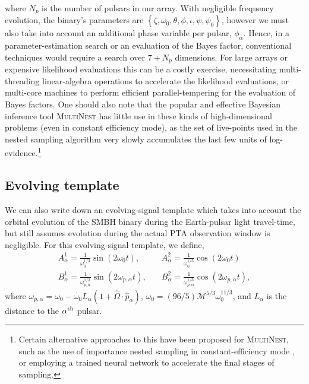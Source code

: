 \documentclass[twocolappendix,tighten]{emulateapj}
\begin{document}
where $N_p$ is the number of pulsars in our array. With negligible frequency evolution, the binary's parameters are $\left\{\zeta,\omega_0,\theta,\phi,\iota,\psi,\psi_0\right\}$, however we must also take into account an additional phase variable per pulsar, $\phi_{\alpha}$. Hence, in a parameter-estimation search or an evaluation of the Bayes factor, conventional techniques would require a search over $7+N_{p}$ dimensions. For large arrays or expensive likelihood evaluations this can be a costly exercise, necessitating multi-threading linear-algebra operations to accelerate the likelihood evaluations, or multi-core machines to perform efficient parallel-tempering for the evaluation of Bayes factors. One should also note that the popular and effective Bayesian inference tool \textsc{MultiNest} has little use in these kinds of high-dimensional problems (even in constant efficiency mode), as the set of live-points used in the nested sampling algorithm very slowly accumulates the last few units of log-evidence.\footnote{Certain alternative approaches to this have been proposed for \textsc{MultiNest}, such as the use of importance nested sampling in constant-efficiency mode \citep{importanceMultiNest2013}, or employing a trained neural network \citep{skynet} to accelerate the final stages of sampling.}

\subsection{Evolving template}

We can also write down an evolving-signal template which takes into account the orbital evolution of the SMBH binary during the Earth-pulsar light travel-time, but still assumes evolution during the actual PTA observation window is negligible. For this evolving-signal template, we define,
\begin{align}
A^1_{\alpha} = \frac{1}{\omega_0^{1/3}}\sin(2\omega_0 t),&\quad A^2_{\alpha} = \frac{1}{\omega_0^{1/3}}\cos(2\omega_0 t) \nonumber\\
B^1_{\alpha} = \frac{1}{\omega_{p,\alpha}^{1/3}}\sin(2\omega_{p,\alpha} t),&\quad B^2_{\alpha} = \frac{1}{\omega_{p,\alpha}^{1/3}}\cos(2\omega_{p,\alpha} t),
\end{align}
where $\omega_{p,\alpha} = \omega_0 - \dot{\omega_0}L_{\alpha}(1+\hat{\Omega}\cdot\hat{p}_{\alpha})$, $\dot\omega_0 = (96/5)\mathcal{M}^{5/3}\omega_0^{11/3}$, and $L_{\alpha}$ is the distance to the $\alpha^{\rm th}$ pulsar. 
\end{document}
